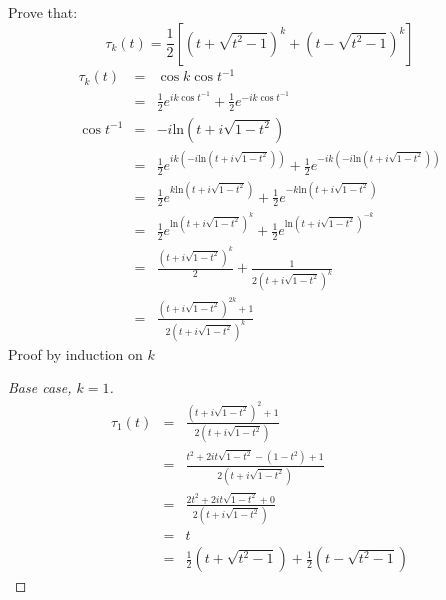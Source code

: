 \documentclass{article}
\newcommand{\ea}[1]{\begin{eqnarray*}#1\end{eqnarray*}}
\newcommand{\inv}[1]{#1^{-1}}
\begin{document}
 Prove that:
\[
	\tau_k(t) = \frac{1}{2}\left[ \left(t+\sqrt{t^2-1}\right)^k + 
		\left(t-\sqrt{t^2-1}\right)^k\right]
\]
\ea{
\tau_k(t) &=& \cos k \inv{\cos t}\\
	&=& \frac{1}{2}e^{ik\inv{\cos t}} + \frac{1}{2}e^{-ik\inv{\cos t}} \\
	\inv{\cos t} &=& -i \textrm{ln}(t + i\sqrt{1-t^2})\\
	&=& \frac{1}{2}e^{ik(-i \textrm{ln}(t + i\sqrt{1-t^2}))} + 
		\frac{1}{2}e^{-ik(-i \textrm{ln}(t + i\sqrt{1-t^2}))} \\
		&=&  \frac{1}{2}e^{k\textrm{ln}(t+i\sqrt{1-t^2})} +
		\frac{1}{2}e^{-k\textrm{ln}(t+i\sqrt{1-t^2})} \\
		&=&  \frac{1}{2}e^{\textrm{ln}(t+i\sqrt{1-t^2})^k} + 
		\frac{1}{2}e^{\textrm{ln}(t+i\sqrt{1-t^2})^{-k}} \\
	&=& \frac{\left( t + i \sqrt{1-t^2} \right)^k }{2} +
		\frac{1}{2\left( t + i \sqrt{1-t^2} \right)^k} \\
		&=& \frac{\left( t + i \sqrt{1-t^2} \right)^{2k} + 1}
	        {2\left( t + i \sqrt{1-t^2} \right)^k}
}
Proof by induction on $k$
\begin{proof}[Base case, $k=1$]
\ea{
	\tau_1(t) &=&  \frac{\left( t + i \sqrt{1-t^2} \right)^{2} + 1}
	            {2\left( t + i \sqrt{1-t^2} \right)}\\
			&=& \frac{ t^2 + 2it\sqrt{1-t^2} - (1-t^2) + 1}
				{2\left( t + i \sqrt{1-t^2} \right)}\\
			&=& \frac{ 2t^2 + 2it\sqrt{1-t^2} + 0}
				 {2\left( t + i \sqrt{1-t^2} \right)}\\
			&=& t \\
			&=& \frac{1}{2}(t + \sqrt{t^2-1}) + \frac{1}{2}(t - \sqrt{t^2-1})
}
\end{proof}
\end{document}
